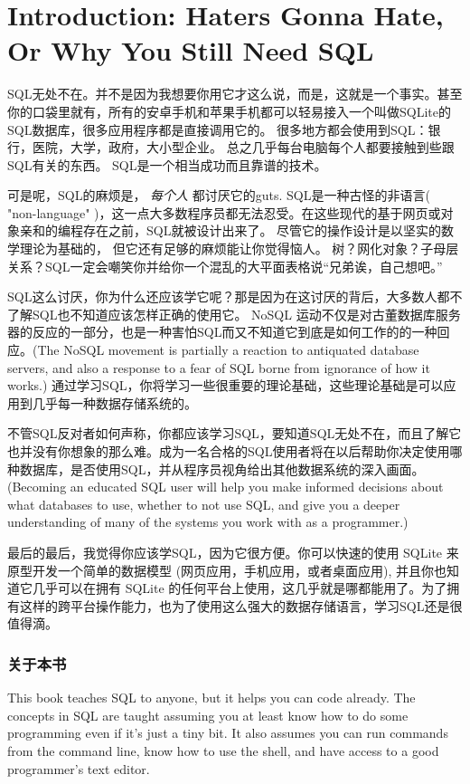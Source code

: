 \chapter*{Introduction: Haters Gonna Hate, Or Why You Still Need SQL}

SQL无处不在。并不是因为我想要你用它才这么说，而是，这就是一个事实。甚至你的口袋里就有，所有的安卓手机和苹果手机都可以轻易接入一个叫做SQLite的SQL数据库，很多应用程序都是直接调用它的。 很多地方都会使用到SQL：银行，医院，大学，政府，大小型企业。 总之几乎每台电脑每个人都要接触到些跟SQL有关的东西。 SQL是一个相当成功而且靠谱的技术。 

可是呢，SQL的麻烦是， \emph{每个人} 都讨厌它的guts.  SQL是一种古怪的非语言( "non-language" )，这一点大多数程序员都无法忍受。在这些现代的基于网页或对象亲和的编程存在之前，SQL就被设计出来了。 尽管它的操作设计是以坚实的数学理论为基础的， 但它还有足够的麻烦能让你觉得恼人。 树？网化对象？子母层关系？SQL一定会嘲笑你并给你一个混乱的大平面表格说“兄弟诶，自己想吧。”

SQL这么讨厌，你为什么还应该学它呢？那是因为在这讨厌的背后，大多数人都不了解SQL也不知道应该怎样正确的使用它。  NoSQL 运动不仅是对古董数据库服务器的反应的一部分，也是一种害怕SQL而又不知道它到底是如何工作的的一种回应。(The NoSQL movement is partially a reaction to antiquated database servers, and also a response to a fear of SQL borne from ignorance of how it works.) 通过学习SQL，你将学习一些很重要的理论基础，这些理论基础是可以应用到几乎每一种数据存储系统的。

不管SQL反对者如何声称，你都应该学习SQL，要知道SQL无处不在，而且了解它也并没有你想象的那么难。成为一名合格的SQL使用者将在以后帮助你决定使用哪种数据库，是否使用SQL，并从程序员视角给出其他数据系统的深入画面。(Becoming an educated SQL user will help you make informed decisions about what databases to use, whether to not use SQL, and give you a deeper understanding of many of the systems you work with as a programmer.)

最后的最后，我觉得你应该学SQL，因为它很方便。你可以快速的使用 SQLite 来原型开发一个简单的数据模型 (网页应用，手机应用，或者桌面应用), 并且你也知道它几乎可以在拥有 SQLite 的任何平台上使用，这几乎就是哪都能用了。为了拥有这样的跨平台操作能力，也为了使用这么强大的数据存储语言，学习SQL还是很值得滴。

\subsection*{关于本书}

This book teaches SQL to anyone, but it helps you can code already.  The 
concepts in SQL are taught assuming you at least know how to do some programming
even if it's just a tiny bit.  It also assumes you can run commands from the
command line, know how to use the shell, and have access to a good programmer's
text editor.

